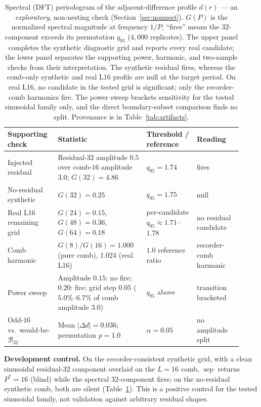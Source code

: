 \documentclass{article}
\begin{document}
\begin{table}[H]
\begin{tabular}{@{}>{\raggedright\arraybackslash}p{0.20\linewidth}
                    >{\raggedright\arraybackslash}p{0.34\linewidth}
                    >{\raggedright\arraybackslash}p{0.20\linewidth}
                    >{\raggedright\arraybackslash}p{0.18\linewidth}@{}}
\toprule
Supporting check & Statistic & Threshold / reference & Reading \\
\midrule
Injected residual & Residual-$32$ amplitude $0.5$ over comb-$16$ amplitude
$3.0$; $G(32){=}4.86$ & $q_{95}{=}1.74$ & fires \\
No-residual synthetic & $G(32){=}0.25$ & $q_{95}{=}1.75$ & null \\
Real L16 remaining grid & $G(24){=}0.15$, $G(48){=}0.36$,
$G(64){=}0.18$ & per-candidate $q_{95}\approx1.71$--$1.78$ & no residual candidate \\
Comb harmonic & $G(8)/G(16){=}1.000$ (pure comb), $1.024$ (real L16) &
$1.0$ reference ratio & recorder-comb harmonic \\
Power sweep & Amplitude $0.15$: no fire; $0.20$: fire; grid step $0.05$
($5.0\%$--$6.7\%$ of comb amplitude $3.0$) & $q_{95}$ above & transition bracketed \\
Odd-$16$ vs.\ would-be-$\mathcal B_{32}$ & Mean $|\Delta d|{=}0.036$;
permutation $p{=}1.0$ & $\alpha=0.05$ & no amplitude split \\
\bottomrule
\end{tabular}
\caption{Spectral (DFT) periodogram of the adjacent-difference profile
$d(r)$ --- an \emph{exploratory}, non-nesting check (Section~\ref{sec:nonnest}).
$G(P)$ is the normalized spectral magnitude at frequency $1/P$; ``fires''
means the $32$-component exceeds its permutation $q_{95}$ ($4{,}000$ replicates).
The upper panel completes the synthetic diagnostic grid and reports every real
candidate; the lower panel separates the supporting power, harmonic, and
two-sample checks from their interpretation. The synthetic residual fires,
whereas the comb-only synthetic and real L16 profile are null at the target
period. On real L16, no candidate in the tested grid is significant; only the
recorder-comb harmonics fire. The power sweep brackets sensitivity for the tested
sinusoidal family only, and the direct boundary-subset comparison finds no split.
Provenance is in Table~\ref{tab:artifacts}.}
\label{tab:spectral}
\end{table}

\textbf{Development control.} On the recorder-consistent synthetic grid, with a clean
sinusoidal residual-$32$ component overlaid on the $L{=}16$ comb,
$\operatorname{sep}$ returns $P^*{=}16$ (blind) while the spectral
$32$-component fires; on the no-residual synthetic comb, both are silent
(Table~\ref{tab:spectral}). This is a positive control for the tested sinusoidal
family, not validation against arbitrary residual shapes.
\end{document}
